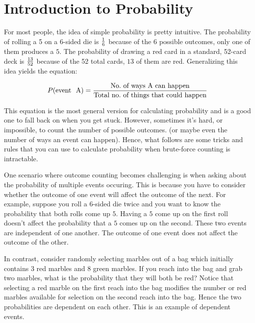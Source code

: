 \chapter{Introduction to Probability}
 \label{chap:probability} 

  For most people, the idea of simple
 probability is pretty intuitive.  The probability of rolling a 5 on a
 6-sided die is ${ 1\over 6}$ because of the $6$ possible outcomes,
 only one of them produces a $5$.  The probability of drawing a red
 card in a standard, 52-card deck is ${13\over 52}$ because of the 52
 total cards, $13$ of them are red.  Generalizing this idea yields the
 equation:

\begin{equation}\label{eq:simpleProb}
  P(\text{event~ A}) = {\text{No.~of~ways~A~can~happen}\over \text{Total~no.~of~things~that~could~happen}}
\end{equation}


This equation is the most general version for calculating probability
and is a good one to fall back on when you get stuck.  However,
sometimes it's hard, or impossible, to count the number of possible
outcomes. (or maybe even the number of ways an event can
happen). Hence, what follows are some tricks and rules that you can
use to calculate probability when brute-force counting is intractable.


One scenario where outcome counting becomes challenging is when asking
about the probability of multiple events occuring.  This is because
you have to consider whether the outcome of one event will affect the
outcome of the next.  For example, suppose you roll a $6$-sided
die twice and you want to know the probability that both rolls come up $5$.
Having a $5$ come up on the first roll doesn't affect the probability
that a $5$ comes up on the second.  These two events are independent
of one another.  The outcome of one event does not affect the outcome
of the other.

In contrast, consider randomly selecting marbles out of a bag which initially
contains $3$ red marbles and $8$ green marbles.  If you reach into the
bag and grab two marbles, what is the probability that they will both
be red?  Notice that selecting a red marble on the first reach into the bag
modifies the number or red marbles available for selection on the
second reach into the bag. Hence the two probabilities are dependent
on each other.  This is an example of dependent events.

